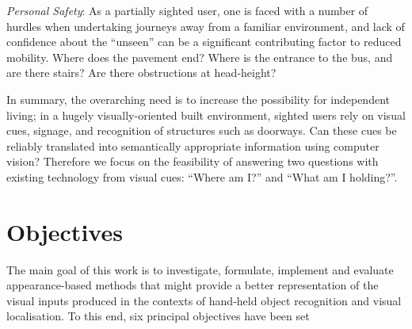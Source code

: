 \emph{Personal Safety}: As a partially sighted user, one is faced with a number of hurdles when undertaking journeys away from a familiar environment, and lack of confidence about the ``unseen'' can be a significant contributing factor to reduced mobility.  Where does the pavement end?  Where is the entrance to the bus, and are there stairs?  Are there obstructions at head-height?   

In summary, the overarching need is to increase the possibility for independent living; in a hugely visually-oriented built environment, sighted users rely on visual cues, signage, and recognition of structures such as doorways.  Can these cues be reliably translated into semantically appropriate information using computer vision? Therefore we focus on the feasibility of answering two questions with existing technology from visual cues: ``Where am I?'' and ``What am I holding?''. 

\section{Objectives}

The main goal of this work is to investigate, formulate, implement and evaluate appearance-based methods that might provide a better representation of the visual inputs produced in the contexts of hand-held object recognition and visual localisation. To this end, six principal objectives have been set

%
%

